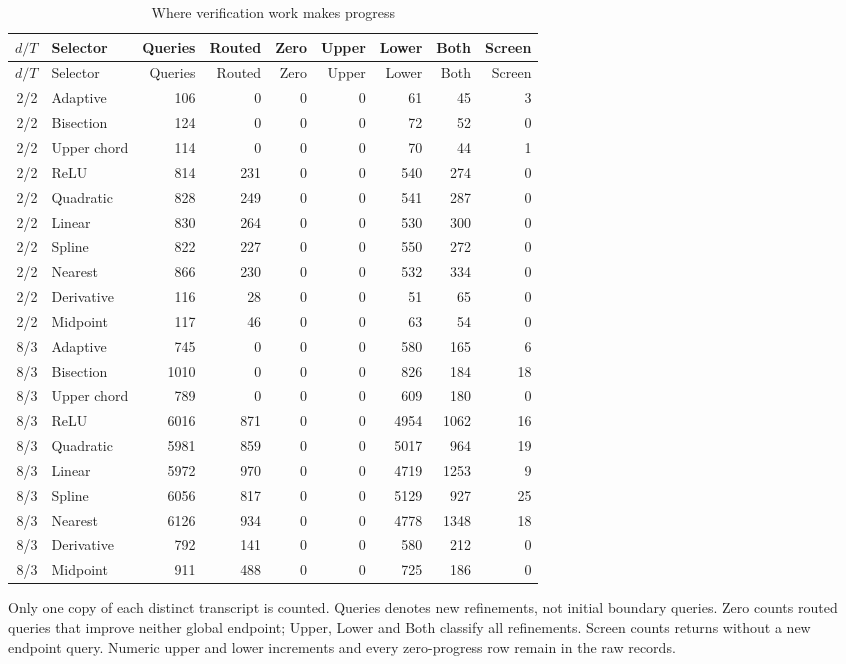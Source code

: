 \begingroup\small\setlength{\tabcolsep}{4pt}
\begin{longtable}{rlrrrrrrr}
\caption{Where verification work makes progress}\label{tab:progress67}\\
\toprule
$d/T$ & Selector & Queries & Routed & Zero & Upper & Lower & Both & Screen \\
\midrule
\endfirsthead
$d/T$ & Selector & Queries & Routed & Zero & Upper & Lower & Both & Screen \\
\midrule
\endhead
2/2 & Adaptive & 106 & 0 & 0 & 0 & 61 & 45 & 3 \\
2/2 & Bisection & 124 & 0 & 0 & 0 & 72 & 52 & 0 \\
2/2 & Upper chord & 114 & 0 & 0 & 0 & 70 & 44 & 1 \\
2/2 & ReLU & 814 & 231 & 0 & 0 & 540 & 274 & 0 \\
2/2 & Quadratic & 828 & 249 & 0 & 0 & 541 & 287 & 0 \\
2/2 & Linear & 830 & 264 & 0 & 0 & 530 & 300 & 0 \\
2/2 & Spline & 822 & 227 & 0 & 0 & 550 & 272 & 0 \\
2/2 & Nearest & 866 & 230 & 0 & 0 & 532 & 334 & 0 \\
2/2 & Derivative & 116 & 28 & 0 & 0 & 51 & 65 & 0 \\
2/2 & Midpoint & 117 & 46 & 0 & 0 & 63 & 54 & 0 \\
8/3 & Adaptive & 745 & 0 & 0 & 0 & 580 & 165 & 6 \\
8/3 & Bisection & 1010 & 0 & 0 & 0 & 826 & 184 & 18 \\
8/3 & Upper chord & 789 & 0 & 0 & 0 & 609 & 180 & 0 \\
8/3 & ReLU & 6016 & 871 & 0 & 0 & 4954 & 1062 & 16 \\
8/3 & Quadratic & 5981 & 859 & 0 & 0 & 5017 & 964 & 19 \\
8/3 & Linear & 5972 & 970 & 0 & 0 & 4719 & 1253 & 9 \\
8/3 & Spline & 6056 & 817 & 0 & 0 & 5129 & 927 & 25 \\
8/3 & Nearest & 6126 & 934 & 0 & 0 & 4778 & 1348 & 18 \\
8/3 & Derivative & 792 & 141 & 0 & 0 & 580 & 212 & 0 \\
8/3 & Midpoint & 911 & 488 & 0 & 0 & 725 & 186 & 0 \\
\bottomrule
\end{longtable}
\endgroup
\noindent Only one copy of each distinct transcript is counted. Queries denotes new refinements, not initial boundary queries. Zero counts routed queries that improve neither global endpoint; Upper, Lower and Both classify all refinements. Screen counts returns without a new endpoint query. Numeric upper and lower increments and every zero-progress row remain in the raw records.
